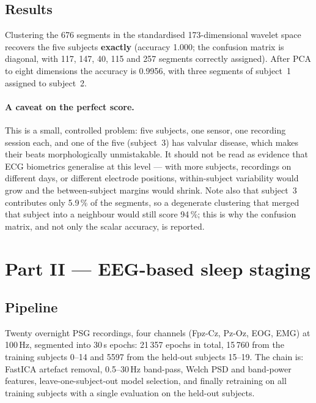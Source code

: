 \documentclass[11pt,a4paper]{article}
\newcommand{\hertz}{Hz}
\newcommand{\second}{s}
\newcommand{\percent}{\%}
\newcommand{\num}[1]{#1}
\newcommand{\numrange}[2]{#1--#2}
\newcommand{\SI}[2]{#1\,#2}
\newcommand{\SIrange}[3]{#1--#2\,#3}
\begin{document}
\subsection{Results}

Clustering the \num{676} segments in the standardised \num{173}-dimensional wavelet space
recovers the five subjects \textbf{exactly} (accuracy \num{1.000}; the confusion matrix is
diagonal, with 117, 147, 40, 115 and 257 segments correctly assigned). After PCA to eight
dimensions the accuracy is \num{0.9956}, with three segments of subject~1 assigned to
subject~2.

\paragraph{A caveat on the perfect score.} This is a small, controlled problem: five subjects,
one sensor, one recording session each, and one of the five (subject~3) has valvular disease,
which makes their beats morphologically unmistakable. It should not be read as evidence that
ECG biometrics generalise at this level --- with more subjects, recordings on different days,
or different electrode positions, within-subject variability would grow and the between-subject
margins would shrink. Note also that subject~3 contributes only \SI{5.9}{\percent} of the
segments, so a degenerate clustering that merged that subject into a neighbour would still
score \SI{94}{\percent}; this is why the confusion matrix, and not only the scalar accuracy,
is reported.

\section{Part II --- EEG-based sleep staging}

\subsection{Pipeline}

Twenty overnight PSG recordings, four channels (Fpz-Cz, Pz-Oz, EOG, EMG) at \SI{100}{\hertz},
segmented into \SI{30}{\second} epochs: \num{21\,357} epochs in total, \num{15\,760} from the
training subjects \numrange{0}{14} and \num{5597} from the held-out subjects
\numrange{15}{19}. The chain is: FastICA artefact removal, \SIrange{0.5}{30}{\hertz}
band-pass, Welch PSD and band-power features, leave-one-subject-out model selection, and
finally retraining on all training subjects with a single evaluation on the held-out subjects.
\end{document}
